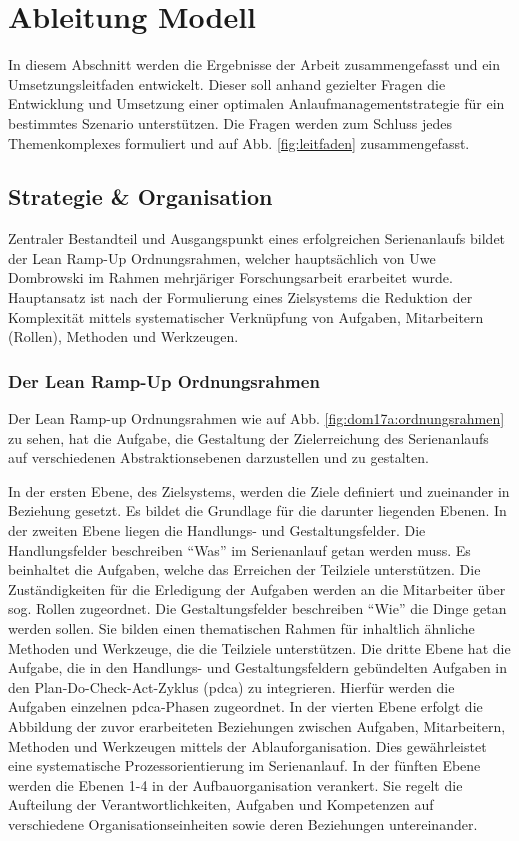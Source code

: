 \chapter{Ableitung Modell}\label{sec:ableitung}
In diesem Abschnitt werden die Ergebnisse der Arbeit zusammengefasst und ein Umsetzungsleitfaden entwickelt. %
Dieser soll anhand gezielter Fragen die Entwicklung und Umsetzung einer optimalen Anlaufmanagementstrategie für ein bestimmtes Szenario unterstützen. 
Die Fragen werden zum Schluss jedes Themenkomplexes formuliert und auf Abb. \ref{fig:leitfaden} %
zusammengefasst. 

\section{Strategie \& Organisation}

Zentraler Bestandteil und Ausgangspunkt eines erfolgreichen Serienanlaufs bildet der Lean Ramp-Up Ordnungsrahmen, welcher hauptsächlich von Uwe Dombrowski im Rahmen mehrjäriger Forschungsarbeit erarbeitet wurde. Hauptansatz ist nach der Formulierung eines Zielsystems die Reduktion der Komplexität mittels systematischer Verknüpfung von Aufgaben, Mitarbeitern (Rollen), Methoden und Werkzeugen. 

\subsection*{Der Lean Ramp-Up Ordnungsrahmen}
 Der Lean Ramp-up Ordnungsrahmen wie auf Abb. \ref{fig:dom17a:ordnungsrahmen} zu sehen, hat die Aufgabe, die Gestaltung der Zielerreichung des Serienanlaufs auf verschiedenen Abstraktionsebenen darzustellen und zu gestalten. 
 
In der ersten Ebene, des Zielsystems, werden die Ziele definiert und zueinander in Beziehung gesetzt. Es bildet die Grundlage für die darunter liegenden Ebenen. 
% 
In der zweiten Ebene liegen die Handlungs- und Gestaltungsfelder. Die Handlungsfelder beschreiben ``Was'' im Serienanlauf getan werden muss. 
Es beinhaltet die Aufgaben, welche das Erreichen der Teilziele unterstützen. Die Zuständigkeiten für die Erledigung der Aufgaben werden an die Mitarbeiter über sog. Rollen zugeordnet.
Die Gestaltungsfelder beschreiben ``Wie'' die Dinge getan werden sollen. Sie bilden einen thematischen Rahmen für inhaltlich ähnliche Methoden und Werkzeuge, die die Teilziele unterstützen.
% 
Die dritte Ebene hat die Aufgabe, die in den Handlungs- und Gestaltungsfeldern gebündelten Aufgaben in den Plan-Do-Check-Act-Zyklus (\gls{pdca}) zu integrieren. Hierfür werden die Aufgaben einzelnen \gls{pdca}-Phasen zugeordnet. 
% 
In der vierten Ebene erfolgt die Abbildung der zuvor erarbeiteten Beziehungen zwischen Aufgaben, Mitarbeitern, Methoden und Werkzeugen mittels der Ablauforganisation.  Dies gewährleistet eine systematische Prozessorientierung im Serienanlauf. 
% 
In der fünften Ebene werden die Ebenen 1-4 in der Aufbauorganisation verankert. Sie regelt die Aufteilung der Verantwortlichkeiten, Aufgaben und Kompetenzen auf verschiedene Organisationseinheiten sowie deren Beziehungen untereinander. 

